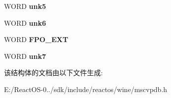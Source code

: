 \begin{DoxyCompactItemize}
W\+O\+RD {\bfseries unk5}
\item 
\mbox{\label{struct_p_d_b___s_t_r_e_a_m___i_n_d_e_x_e_s_ae802d49920ffc1f927299ef7f51d6196}} 
W\+O\+RD {\bfseries unk6}
\item 
\mbox{\label{struct_p_d_b___s_t_r_e_a_m___i_n_d_e_x_e_s_ad648888d5f12eecf2218c7ae7822aca7}} 
W\+O\+RD {\bfseries F\+P\+O\+\_\+\+E\+XT}
\item 
\mbox{\label{struct_p_d_b___s_t_r_e_a_m___i_n_d_e_x_e_s_ad74f505ca697cadb772af7762ea00384}} 
W\+O\+RD {\bfseries unk7}
\end{DoxyCompactItemize}


该结构体的文档由以下文件生成\+:\begin{DoxyCompactItemize}
\item 
E\+:/\+React\+O\+S-\/0../sdk/include/reactos/wine/mscvpdb.\+h\end{DoxyCompactItemize}
